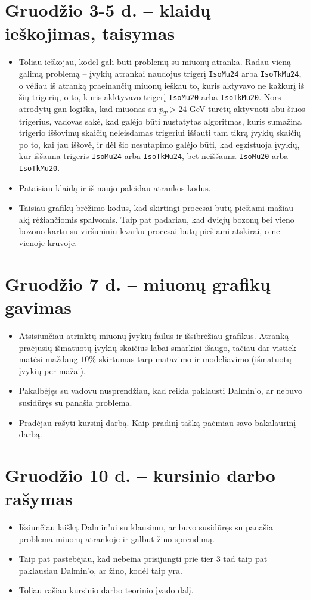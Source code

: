 \documentclass[a4paper, 12pt]{article}
\newcommand{\pT}{p_{T}}
\newcommand{\ttt}[1]{\texttt{#1}}
\begin{document}
\section{Gruodžio 3-5 d. -- klaidų ieškojimas, taisymas}
\begin{itemize}
	\item Toliau ieškojau, kodel gali būti problemų su miuonų atranka.
	Radau vieną galimą problemą -- įvykių atrankai naudojus trigerį \ttt{IsoMu24} arba \ttt{IsoTkMu24}, o
	vėliau iš atranką praeinančių miuonų ieškau to, kuris aktyvavo ne kažkurį iš šių trigerių, o to, kuris akktyvavo
	trigerį \ttt{IsoMu20} arba \ttt{IsoTkMu20}. Nors atrodytų gan logiška, kad miuonas su $\pT > 24$ GeV turėtų aktyvuoti
	abu šiuos trigerius, vadovas sakė, kad galėjo būti nustatytas algoritmas, kuris sumažina trigerio iššovimų skaičių
	neleisdamas trigeriui iššauti tam tikrą įvykių skaičių po to, kai jau iššovė, ir dėl šio nesutapimo galėjo būti, kad
	egzistuoja įvykių, kur iššauna trigeris \ttt{IsoMu24} arba \ttt{IsoTkMu24}, bet neiššauna \ttt{IsoMu20} arba \ttt{IsoTkMu20}.
	\item Pataisiau klaidą ir iš naujo paleidau atrankos kodus.
	\item Taisiau grafikų brėžimo kodus, kad skirtingi procesai būtų piešiami mažiau akį rėžiančiomis spalvomis.
	Taip pat padariau, kad dviejų bozonų bei vieno bozono kartu su viršūniniu kvarku procesai būtų piešiami atskirai, o ne
	vienoje krūvoje.
\end{itemize}

\section{Gruodžio 7 d. -- miuonų grafikų gavimas}
\begin{itemize}
	\item Atsisiunčiau atrinktų miuonų įvykių failus ir išsibrėžiau grafikus.
	Atranką praėjusių išmatuotų įvykių skaičius labai smarkiai išaugo, tačiau dar vistiek matėsi maždaug $10\%$ skirtumas tarp
	matavimo ir modeliavimo (išmatuotų įvykių per mažai).
	\item Pakalbėjęs su vadovu nusprendžiau, kad reikia paklausti Dalmin'o, ar nebuvo susidūręs su panašia problema.
	\item Pradėjau rašyti kursinį darbą. Kaip pradinį tašką paėmiau savo bakalaurinį darbą.
\end{itemize}

\section{Gruodžio 10 d. -- kursinio darbo rašymas}
\begin{itemize}
	\item Išsiunčiau laišką Dalmin'ui su klausimu, ar buvo susidūręs su panašia problema miuonų atrankoje ir galbūt žino sprendimą.
	\item Taip pat pastebėjau, kad nebeina prisijungti prie tier 3 tad taip pat paklausiau Dalmin'o, ar žino, kodėl taip yra.
	\item Toliau rašiau kursinio darbo teorinio įvado dalį.
\end{itemize}
\end{document}
